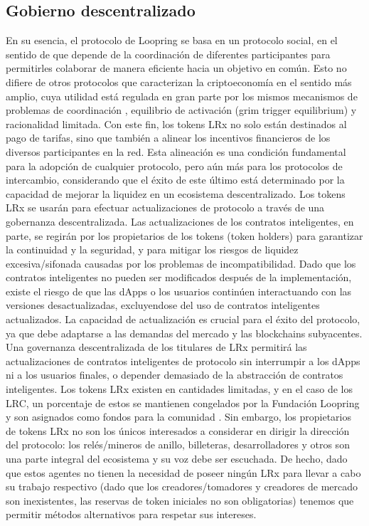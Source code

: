 \documentclass[UTF8,nofonts]{article}
\begin{document}
\begin{multicols}{2}
\subsection{Gobierno descentralizado}
En su esencia, el protocolo de Loopring se basa en un protocolo social, en el sentido de que depende de la coordinaci\'on de diferentes participantes para permitirles colaborar de manera eficiente hacia un objetivo en com\'un. Esto no difiere de otros protocolos que caracterizan la criptoeconom\'ia en el sentido m\'as amplio, cuya utilidad est\'a regulada en gran parte por los mismos mecanismos de problemas de coordinaci\'on \cite{vitalikgovernance}, equilibrio de activaci\'on (grim trigger equilibrium) y racionalidad limitada. Con este fin, los tokens LRx no solo est\'an destinados al pago de tarifas, sino que tambi\'en a alinear los incentivos financieros de los diversos participantes en la red. Esta alineaci\'on es una condici\'on fundamental para la adopci\'on de cualquier protocolo, pero a\'un m\'as para los protocolos de intercambio, considerando que el \'exito de este \'ultimo est\'a determinado por la capacidad de mejorar la liquidez en un ecosistema descentralizado. 
Los tokens LRx se usar\'an para efectuar actualizaciones de protocolo a trav\'es de una gobernanza descentralizada. Las actualizaciones de los contratos inteligentes, en parte, se regir\'an por los propietarios de los tokens (token holders) para garantizar la continuidad y la seguridad, y para mitigar los riesgos de liquidez excesiva/sifonada causadas por los problemas de incompatibilidad. Dado que los contratos inteligentes no pueden ser modificados despu\'es de la implementaci\'on, existe el riesgo de que las dApps o los usuarios contin\'uen interactuando con las versiones desactualizadas, excluyendose del uso de contratos inteligentes actualizados. La capacidad de actualizaci\'on es crucial para el \'exito del protocolo, ya que debe adaptarse a las demandas del mercado y las blockchains subyacentes. Una governanza descentralizada de los titulares de LRx permitir\'a las actualizaciones de contratos inteligentes de protocolo sin interrumpir a los dApps ni a los usuarios finales, o depender demasiado de la abstracci\'on de contratos inteligentes. Los tokens LRx existen en cantidades limitadas, y en el caso de los LRC, un porcentaje de estos se mantienen congelados por la Fundaci\'on Loopring y son asignados como fondos para la comunidad \cite{LRCtokendoc}.
Sin embargo, los propietarios de tokens LRx no son los \'unicos interesados a considerar en dirigir la direcci\'on del protocolo: los rel\'es/mineros de anillo, billeteras, desarrolladores y otros son una parte integral del ecosistema y su voz debe ser escuchada. De hecho, dado que estos agentes no tienen la necesidad de poseer ning\'un LRx para llevar a cabo su trabajo respectivo (dado que los creadores/tomadores y creadores de mercado son inexistentes, las reservas de token iniciales no son obligatorias) tenemos que permitir m\'etodos alternativos para respetar sus intereses.


\end{multicols}
\end{document}
